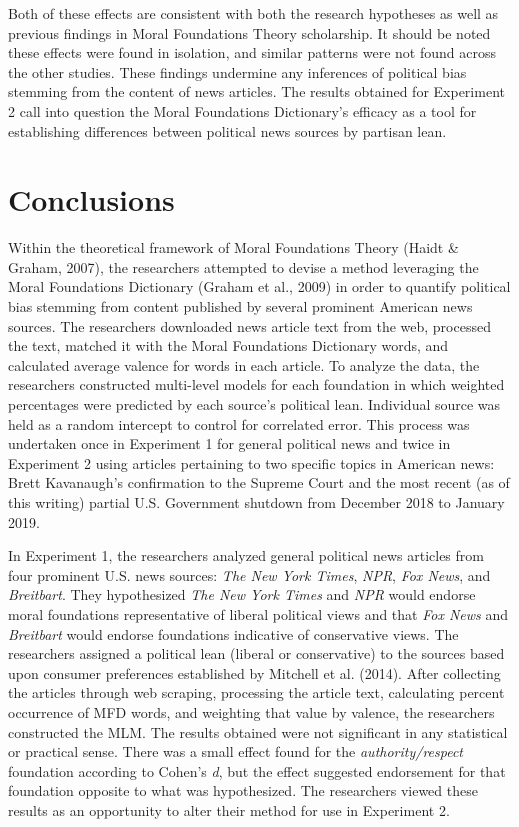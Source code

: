 \documentclass[english,,man]{apa6}
\begin{document}
Both of these effects are consistent with both the research hypotheses as well as previous findings in Moral Foundations Theory scholarship. It should be noted these effects were found in isolation, and similar patterns were not found across the other studies. These findings undermine any inferences of political bias stemming from the content of news articles. The results obtained for Experiment 2 call into question the Moral Foundations Dictionary's efficacy as a tool for establishing differences between political news sources by partisan lean.

\hypertarget{conclusions}{%
\section{Conclusions}\label{conclusions}}

Within the theoretical framework of Moral Foundations Theory (Haidt \& Graham, 2007), the researchers attempted to devise a method leveraging the Moral Foundations Dictionary (Graham et al., 2009) in order to quantify political bias stemming from content published by several prominent American news sources. The researchers downloaded news article text from the web, processed the text, matched it with the Moral Foundations Dictionary words, and calculated average valence for words in each article. To analyze the data, the researchers constructed multi-level models for each foundation in which weighted percentages were predicted by each source's political lean. Individual source was held as a random intercept to control for correlated error. This process was undertaken once in Experiment 1 for general political news and twice in Experiment 2 using articles pertaining to two specific topics in American news: Brett Kavanaugh's confirmation to the Supreme Court and the most recent (as of this writing) partial U.S. Government shutdown from December 2018 to January 2019.

In Experiment 1, the researchers analyzed general political news articles from four prominent U.S. news sources: \emph{The New York Times}, \emph{NPR}, \emph{Fox News}, and \emph{Breitbart}. They hypothesized \emph{The New York Times} and \emph{NPR} would endorse moral foundations representative of liberal political views and that \emph{Fox News} and \emph{Breitbart} would endorse foundations indicative of conservative views. The researchers assigned a political lean (liberal or conservative) to the sources based upon consumer preferences established by Mitchell et al. (2014). After collecting the articles through web scraping, processing the article text, calculating percent occurrence of MFD words, and weighting that value by valence, the researchers constructed the MLM. The results obtained were not significant in any statistical or practical sense. There was a small effect found for the \emph{authority/respect} foundation according to Cohen's \emph{d}, but the effect suggested endorsement for that foundation opposite to what was hypothesized. The researchers viewed these results as an opportunity to alter their method for use in Experiment 2.
\end{document}
